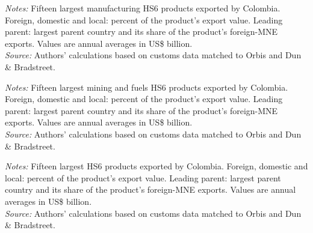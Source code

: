 \documentclass[11pt,a4paper]{article}
\begin{document}
\begin{table}[H]\centering\footnotesize%
  \caption{Colombia, Manufacturing: Fifteen Largest Export Products}%
  \label{tab:c_hs6_COL_manufacturing}%
  \par\vspace{3pt}%
  \begin{minipage}{0.95\textwidth}\footnotesize %
  \textit{Notes:} Fifteen largest manufacturing HS6 products exported by Colombia. Foreign, domestic and local: percent of the product's export value. Leading parent: largest parent country and its share of the product's foreign-MNE exports. Values are annual averages in US\$ billion.\\[3pt]%
  \textit{Source:} Authors' calculations based on customs data matched to Orbis and Dun \& Bradstreet.%
  \end{minipage}%
  \end{table}
\begin{table}[H]\centering\footnotesize%
  \caption{Colombia, Mining and Fuels: Fifteen Largest Export Products}%
  \label{tab:c_hs6_COL_mining}%
  \par\vspace{3pt}%
  \begin{minipage}{0.95\textwidth}\footnotesize %
  \textit{Notes:} Fifteen largest mining and fuels HS6 products exported by Colombia. Foreign, domestic and local: percent of the product's export value. Leading parent: largest parent country and its share of the product's foreign-MNE exports. Values are annual averages in US\$ billion.\\[3pt]%
  \textit{Source:} Authors' calculations based on customs data matched to Orbis and Dun \& Bradstreet.%
  \end{minipage}%
  \end{table}
\begin{table}[H]\centering\footnotesize%
  \caption{Colombia, Other Goods: Fifteen Largest Export Products}%
  \label{tab:c_hs6_COL_rest}%
  \par\vspace{3pt}%
  \begin{minipage}{0.95\textwidth}\footnotesize %
  \textit{Notes:} Fifteen largest HS6 products exported by Colombia. Foreign, domestic and local: percent of the product's export value. Leading parent: largest parent country and its share of the product's foreign-MNE exports. Values are annual averages in US\$ billion.\\[3pt]%
  \textit{Source:} Authors' calculations based on customs data matched to Orbis and Dun \& Bradstreet.%
  \end{minipage}%
  \end{table}
\end{document}
